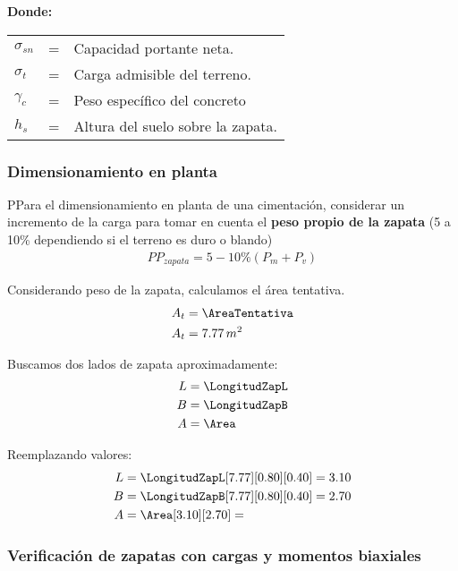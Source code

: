 \textbf{Donde:}

\begin{table}[h!]
    \centering
    \begin{tabular}{lll}
        $\sigma_{sn}$ &=&    Capacidad portante neta.\\
        $\sigma_t$ &=&   Carga admisible del terreno.\\
        $\gamma_c$ &=&    Peso específico del concreto\\
        $h_s$ &=&   Altura del suelo sobre la zapata.\\
    \end{tabular}
\end{table}

\newpage
\subsubsection{Dimensionamiento en planta}

\begin{theo}[Nota:]
    PPara el dimensionamiento en planta de una cimentación, considerar un incremento de la carga para tomar en cuenta el \textbf{peso propio de la zapata} (5 a 10\% dependiendo si el terreno es duro o blando)
    \begin{align}
        PP_{zapata} = 5-10\% (P_m + P_v)
    \end{align}
\end{theo}

Considerando peso de la zapata, calculamos el área tentativa.
\begin{align}
	A_t &= \AreaTentativa\\
	A_t &= 7.77 \, m^2\nonumber
\end{align}

Buscamos dos lados de zapata aproximadamente:
\begin{align}
	L &= \LongitudZapL \\
	B &= \LongitudZapB \\
	A &= \Area
\end{align}

Reemplazando valores:
\begin{align*}
	L &= \LongitudZapL[7.77][0.80][0.40] = 3.10\\
	B &= \LongitudZapB[7.77][0.80][0.40] = 2.70\\
	A &= \Area[3.10][2.70] = 
\end{align*}

\subsubsection{Verificación de zapatas con cargas y momentos biaxiales}

